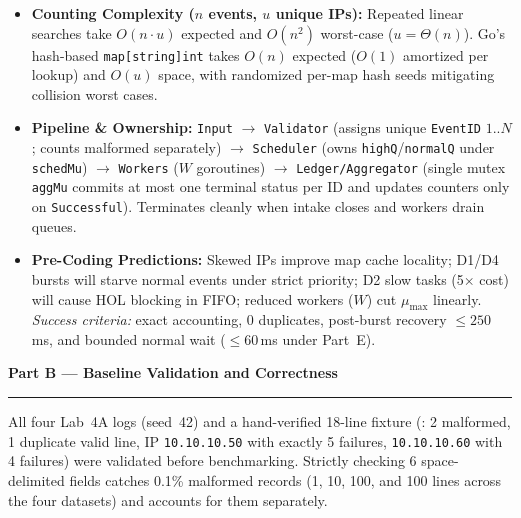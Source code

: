\documentclass[11pt]{article}
\newcommand{\partheader}[1]{%
    \vspace{0.9em}%
    {\noindent\fontsize{13.5}{16}\selectfont\textbf{\color{accentblue}#1}\par}%
    \vspace{0.2em}\hrule\vspace{0.65em}%
}
\begin{document}
\begin{itemize}
    \item \textbf{Counting Complexity ($n$ events, $u$ unique IPs):} Repeated linear searches take $O(n \cdot u)$ expected and $O(n^2)$ worst-case ($u=\Theta(n)$). Go's hash-based \texttt{map[string]int} takes $O(n)$ expected ($O(1)$ amortized per lookup) and $O(u)$ space, with randomized per-map hash seeds mitigating collision worst cases.
    \item \textbf{Pipeline \& Ownership:} \texttt{Input} $\rightarrow$ \texttt{Validator} (assigns unique \texttt{EventID} $1..N$; counts malformed separately) $\rightarrow$ \texttt{Scheduler} (owns \texttt{highQ}/\texttt{normalQ} under \texttt{schedMu}) $\rightarrow$ \texttt{Workers} ($W$ goroutines) $\rightarrow$ \texttt{Ledger/Aggregator} (single mutex \texttt{aggMu} commits at most one terminal status per ID and updates counters only on \texttt{Successful}). Terminates cleanly when intake closes and workers drain queues.
    \item \textbf{Pre-Coding Predictions:} Skewed IPs improve map cache locality; D1/D4 bursts will starve normal events under strict priority; D2 slow tasks (5$\times$ cost) will cause HOL blocking in FIFO; reduced workers ($W$) cut $\mu_{\max}$ linearly. \textit{Success criteria:} exact accounting, 0 duplicates, post-burst recovery $\le 250$\,ms, and bounded normal wait ($\le 60$\,ms under Part~E).
\end{itemize}

\newpage
\partheader{Part B --- Baseline Validation and Correctness}

All four Lab~4A logs (seed~42) and a hand-verified 18-line fixture (: 2 malformed, 1 duplicate valid line, IP \texttt{10.10.10.50} with exactly 5 failures, \texttt{10.10.10.60} with 4 failures) were validated before benchmarking. Strictly checking 6 space-delimited fields catches 0.1\% malformed records (1, 10, 100, and 100 lines across the four datasets) and accounts for them separately.
\end{document}
